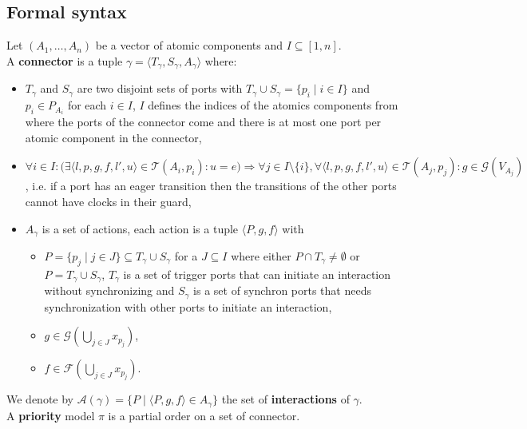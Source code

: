 \documentclass[a4paper]{article}
\begin{document}
\subsection*{Formal syntax}
Let $(A_1, \ldots, A_n)$ be a vector of atomic components and $I \subseteq [1,n]$. \\
A \textbf{connector} is a tuple $\gamma = \langle T_{\gamma}, S_{\gamma}, A_{\gamma} \rangle$ where:
\begin{itemize}
  \item $T_{\gamma}$ and $S_{\gamma}$ are two disjoint sets of ports with
        $T_{\gamma} \cup S_{\gamma} = \{p_i \mid i \in I\}$ and $p_i \in P_{A_i}$ for each $i \in I$, $I$ defines the
        indices of the atomics components from where the ports of the connector come and there is at most one port per
        atomic component in the connector,
  \item $\forall i \in I: \bigl(\exists \langle l, p, g, f, l', u \rangle \in \mathcal{T}(A_i, p_i): u = e
        \bigr) \Rightarrow \forall j \in I \setminus \{i\}, \forall \langle l, p, g, f, l', u \rangle \in
        \mathcal{T}(A_j, p_j): g \in \mathcal{G}(V_{A_j})$, i.e. if a port has an eager
      transition then the transitions of the other ports cannot have clocks in their guard,
  \item $A_{\gamma}$ is a set of actions, each action is a tuple $\langle P, g, f \rangle$ with
        \begin{itemize}
          \item $P = \{p_j \mid j \in J\} \subseteq T_{\gamma} \cup S_{\gamma}$ for a $J \subseteq I$ where either
                $P \cap T_{\gamma} \neq \emptyset$ or $P = T_{\gamma} \cup S_{\gamma}$, $T_{\gamma}$ is a set
                of trigger ports that can initiate an interaction without synchronizing and $S_{\gamma}$ is a set of
                synchron ports that needs synchronization with other ports to initiate an interaction,
          \item $g \in \mathcal{G}(\bigcup_{j \in J} x_{p_j})$,
          \item $f \in \mathcal{F}(\bigcup_{j \in J} x_{p_j})$.
        \end{itemize}
\end{itemize}
We denote by $\mathcal{A}(\gamma) = \{P \mid \langle P, g ,f \rangle \in A_{\gamma}\}$ the set of \textbf{interactions}
of $\gamma$. \\
A \textbf{priority} model $\pi$ is a partial order on a set of connector. \\
\end{document}

